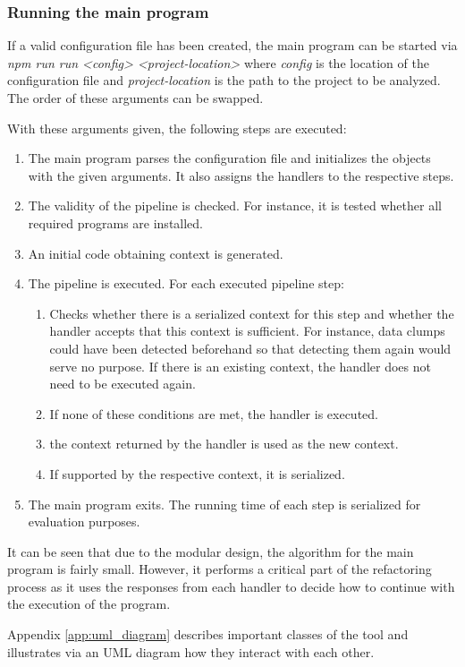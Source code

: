 \subsubsection{Running the main program}


If a valid configuration file has been created, the main program can be started via \textit{npm run run <config> <project-location>} where \textit{config} is the location of the configuration file and \textit{project-location} is the path to the project to be analyzed. The order of these arguments can be swapped. 

With these arguments given, the following steps are executed:

\begin{enumerate}
    \item The main program parses the configuration file and initializes the objects with the given arguments. It also assigns the handlers to the respective steps.
    \item  The validity of the pipeline is checked. For instance, it is tested whether all required programs are installed.
    \item An initial code obtaining context is generated.
    \item The pipeline is executed. For each executed pipeline step:
    \begin{enumerate}
        \item Checks whether there is a serialized context for this step and whether the handler accepts that this context is sufficient. For instance, data clumps could have been detected beforehand so that detecting them again would serve no purpose. If there is an existing context, the handler does not need to be executed again.
        \item If none of these conditions are met, the handler is executed.
        \item the context returned by the handler is used as the new context.
        \item If supported by the respective context, it is serialized.
    \end{enumerate}
    \item The main program exits. The running time of each step is serialized for evaluation purposes. 
\end{enumerate}

It can be seen that due to the modular design, the algorithm for the main program is fairly small. However, it performs a critical part of the refactoring process as it uses the responses from each handler to decide how to continue with the execution of the program. 

Appendix \ref{app:uml_diagram} describes important classes of the tool and illustrates via an \ac{UML} diagram how they interact with each other. 